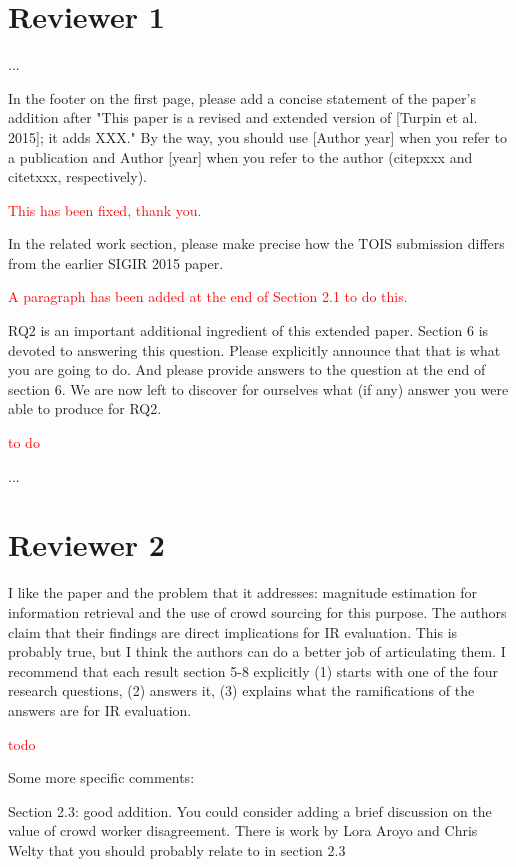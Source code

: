 \documentclass{article}
\newcommand{\comment}[1]{\vspace{1em} \textcolor{red}{{#1}} \vspace{1em}}
\begin{document}
\section{Reviewer 1}

...

In the footer on the first page, please add a concise statement of
the paper's addition after "This paper is a revised and extended
version of [Turpin et al. 2015]; it adds XXX." By the way, you
should use [Author year] when you refer to a publication and Author
[year] when you refer to the author (citep{xxx} and citet{xxx},
respectively).

\comment{This has been fixed, thank you.}

In the related work section, please make precise how the TOIS
submission differs from the earlier SIGIR 2015 paper.

\comment{A paragraph has been added at the end of Section 2.1 to do this.}

RQ2 is an important additional ingredient of this extended paper.
Section 6 is devoted to answering this question. Please explicitly
announce that that is what you are going to do. And please provide
answers to the question at the end of section 6. We are now left
to discover for ourselves what (if any) answer you were able to
produce for RQ2.

\comment{to do }

\noindent ...


\section{Reviewer 2}

I like the paper and the problem that it addresses: magnitude
estimation for information retrieval and the use of crowd sourcing
for this purpose. The authors claim that their findings are direct
implications for IR evaluation. This is probably true, but I think
the authors can do a better job of articulating them. I recommend
that each result section 5-8 explicitly (1) starts with one of the
four research questions, (2) answers it, (3) explains what the
ramifications of the answers are for IR evaluation.

\comment {todo}

Some more specific comments:

Section 2.3: good addition. You could consider adding a brief
discussion on the value of crowd worker disagreement. There is work
by Lora Aroyo and Chris Welty that you should probably relate to
in section 2.3
\end{document}
